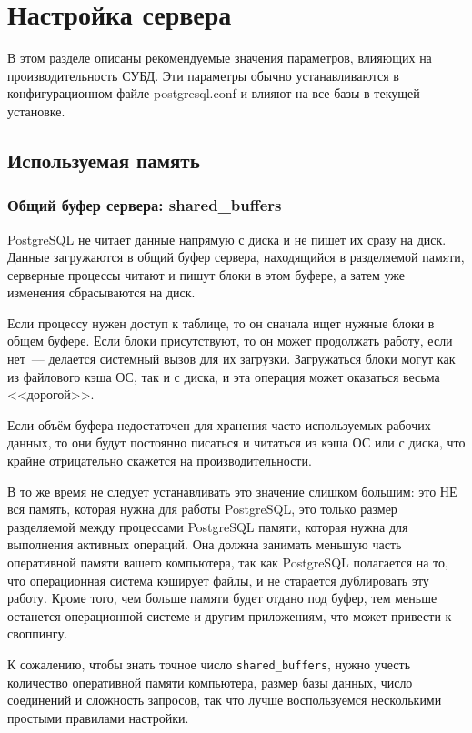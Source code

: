 \section{Настройка сервера}
В этом разделе описаны рекомендуемые значения параметров, влияющих на производительность СУБД. Эти параметры обычно устанавливаются в конфигурационном файле postgresql.conf и влияют на все базы в текущей установке.


\subsection{Используемая память}

\subsubsection{Общий буфер сервера: shared\_buffers}

PostgreSQL не читает данные напрямую с диска и не пишет их сразу на диск. Данные загружаются в общий буфер сервера, находящийся в разделяемой памяти, серверные процессы читают и пишут блоки в этом буфере, а затем уже изменения сбрасываются на диск.

Если процессу нужен доступ к таблице, то он сначала ищет нужные блоки в общем буфере. Если блоки присутствуют, то он может продолжать работу, если нет~--- делается системный вызов для их загрузки. Загружаться блоки могут как из файлового кэша ОС, так и с диска, и эта операция может оказаться весьма <<дорогой>>.

Если объём буфера недостаточен для хранения часто используемых рабочих данных, то они будут постоянно писаться и читаться из кэша ОС или с диска, что крайне отрицательно скажется на производительности.

В то же время не следует устанавливать это значение слишком большим: это НЕ вся память, которая нужна для работы PostgreSQL, это только размер разделяемой между процессами PostgreSQL памяти, которая нужна для выполнения активных операций. Она должна занимать меньшую часть оперативной памяти вашего компьютера, так как PostgreSQL полагается на то, что операционная система кэширует файлы, и не старается дублировать эту работу. Кроме того, чем больше памяти будет отдано под буфер, тем меньше останется операционной системе и другим приложениям, что может привести к своппингу.

К сожалению, чтобы знать точное число \lstinline!shared_buffers!, нужно учесть количество оперативной памяти компьютера, размер базы данных, число соединений и сложность запросов, так что лучше воспользуемся несколькими простыми правилами настройки.

